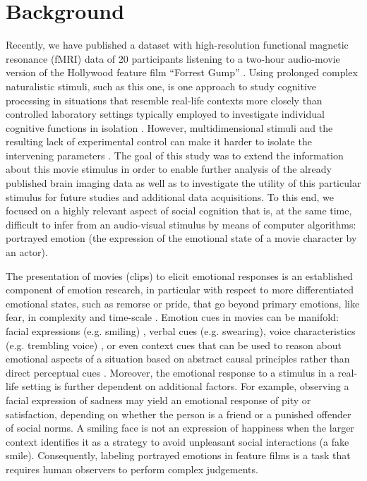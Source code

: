 \documentclass[10pt,a4paper,twocolumn]{article}
\begin{document}
\section*{Background}


Recently, we have published a dataset with high-resolution functional magnetic
resonance (fMRI) data of 20 participants listening to a two-hour audio-movie
version of the Hollywood feature film ``Forrest Gump'' \cite{HBI+14}. Using
prolonged complex naturalistic stimuli, such as this one, is one approach to
study cognitive processing in situations that resemble real-life contexts more
closely than controlled laboratory settings typically employed to investigate
individual cognitive functions in isolation \cite{HH2012}. However,
multidimensional stimuli and the resulting lack of experimental control can
make it harder to isolate the intervening parameters \cite{HH2012}. The goal
of this study was to extend the information about this movie stimulus in order
to enable further analysis of the already published brain imaging data as well
as to investigate the utility of this particular stimulus for future studies and
additional data acquisitions. To this end, we focused on a highly relevant
aspect of social cognition that is, at the same time, difficult to infer from
an audio-visual stimulus by means of computer algorithms: portrayed emotion
(the expression of the emotional state of a movie character by an actor).

The presentation of movies (clips) to elicit emotional responses is an
established component of emotion research, in particular with respect to more
differentiated emotional states, such as remorse or pride, that go beyond
primary emotions, like fear, in complexity and time-scale \cite{GL1995}.
Emotion cues in movies can be manifold: facial expressions (e.g. smiling)
\cite{Ekm1992b}, verbal cues (e.g. swearing), voice characteristics (e.g.
trembling voice) \cite{EVS+2009}, or even context cues that can be used to
reason about emotional aspects of a situation based on abstract causal
principles rather than direct perceptual cues \cite{SS2014}. Moreover, the
emotional response to a stimulus in a real-life setting is further dependent on
additional factors. For example, observing a facial expression of sadness may
yield an emotional response of pity or satisfaction, depending on whether the
person is a friend or a punished offender of social norms. A smiling face is
not an expression of happiness when the larger context identifies it as a
strategy to avoid unpleasant social interactions (a fake smile). Consequently,
labeling portrayed emotions in feature films is a task that requires human
observers to perform complex judgements.
\end{document}
